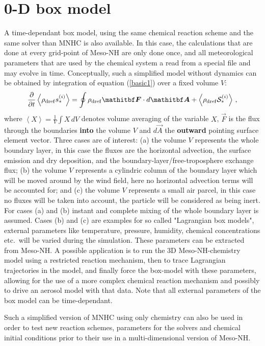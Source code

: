\section{0-D box model}
%
A time-dependant box model, using the same chemical reaction scheme
and the same solver than MNHC is also available.
In this case, the calculations that are done at every grid-point
of Meso-NH are only done once, and all meteorological parameters
that are used by the chemical system a read from a special file
and may evolve in time.
Conceptually, such a simplified model without dynamics can be obtained by
integration of equation (\ref{basic1}) over a fixed volume $V$:
\begin{equation}
\ddt \left<\rhod\scalar{i}\right> =  \oint \rhod\vec F \cdot d\vec A
+ \left< \rhod \source{i} \right>
\,,
\end{equation}
%
where $ \left< X \right> = \frac1V \int X \, dV $ denotes volume averaging 
of the variable $X$, $\vec F$ is the flux through the boundaries {\bf into} the
volume $V$ and $d\vec A$ the {\bf outward} pointing surface element vector.
Three cases are of interest: 
(a) the volume $V$ represents the whole
boundary layer, in this case the fluxes are the horizontal advection,
the surface emission and dry deposition, and the boundary-layer/free-troposphere
exchange flux;
(b) the volume $V$ represents a cylindric column of the boundary layer
which will be moved around by the wind field, here no horizontal advection terms
will be accounted for; and 
(c) the volume $V$ represents a small air parcel, in this case no
fluxes will be taken into account, the particle will be considered
as being inert.
For cases (a) and (b) instant and complete mixing of the whole boundary
layer is assumed. Cases (b) and (c) are examples for
so called "Lagrangian box models", external parameters like temperature,
pressure, humidity, chemical concentrations etc.\ will be 
varied during the simulation.
These parameters can be extracted from Meso-NH.
A possible application is to run the 3D Meso-NH-chemistry model using
a restricted reaction mechanism, then to trace Lagrangian trajectories in the
model, and finally force the box-model with these parameters, allowing 
for the use of 
a more complex chemical reaction mechanism and possibly to drive an aerosol
model with that data.
Note that all external parameters of the box model can be time-dependant.

Such a simplified version of MNHC using only chemistry can also be used
in order to test new reaction schemes, parameters for the solvers and
chemical initial conditions prior to their use in a multi-dimensional
version of Meso-NH.
%
